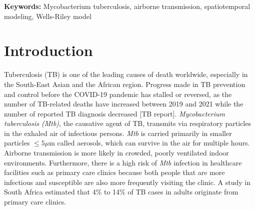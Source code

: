\documentclass[fleqn,11pt]{wlscirep}
\begin{document}
\vspace{2em}


\vspace{0.5em}

\noindent\textbf{Keywords:} Mycobacterium tuberculosis, airborne transmission, spatiotemporal modeling, Wells-Riley model
\newpage

\sloppy
\raggedbottom

\newpage

\section{Introduction} 

Tuberculosis (TB) is one of the leading causes of death worldwide, especially in the South-East Asian and the African region\cite{WHO2022TBReport}. Progress made in TB prevention and control before the COVID-19 pandemic has stalled or reversed, as the number of TB-related deaths have increased between 2019 and 2021 while the number of reported TB diagnosis decreased [TB report]. \emph{Mycobacterium tuberculosis (Mtb)}, the causative agent of TB, transmits via respiratory particles in the exhaled air of infectious persons\cite{Rieder1999,Patterson2021Tuberculosis}. \emph{Mtb} is carried primarily in smaller particles $\leq5\mu$m called aerosols\cite{Fennelly2020Lancet}, which can survive in the air for multiple hours\cite{Loudon1969AMRRD}. Airborne transmission is more likely in crowded, poorly ventilated indoor environments\cite{Rieder1999,CPS2013Book,Nardell1991ARRD,Wang2021Science,Morawska2021}. Furthermore, there is a high risk of \emph{Mtb} infection in healthcare facilities such as primary care clinics because both people that are more infectious and susceptible are also more frequently visiting the clinic\cite{McCreesh2020IJTLD}. A study in South Africa estimated that 4\% to 14\% of TB cases in adults originate from primary care clinics\cite{McCreesh2022BMJGlobalHealth}.
\end{document}
